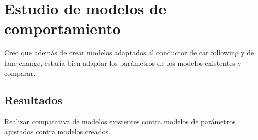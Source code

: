 \chapter{Estudio de modelos de comportamiento}
\label{ch:behavior-models-study}

Creo que además de crear modelos adaptados al conductor de car following y de lane change, estaría bien adaptar los parámetros de los modelos existentes y comparar.

\section{Resultados}
\label{ch:behavior-models-study:results}

Realizar comparativa de modelos existentes contra modelos de parámetros ajustados contra modelos creados.